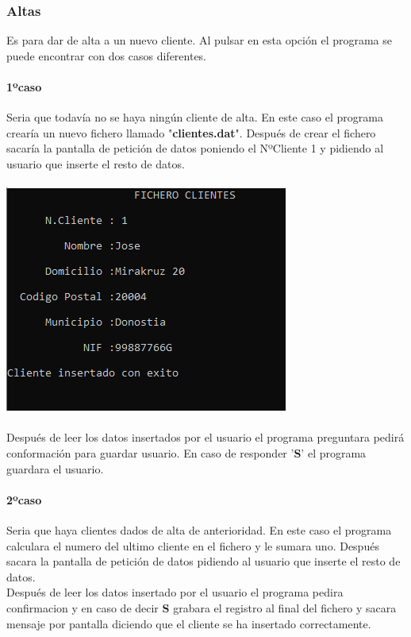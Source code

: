 \documentclass[12pt]{article}
\begin{document}
\subsubsection{Altas}
Es para dar de alta a un nuevo cliente. Al pulsar en esta opción el programa se puede encontrar con dos casos diferentes.

\paragraph{1ºcaso}
Seria que todavía no se haya ningún cliente de alta. En este caso el programa crearía un nuevo fichero llamado "\textbf{clientes.dat}". Después de crear el fichero sacaría la pantalla de petición de datos poniendo el NºCliente 1 y pidiendo al usuario que inserte el resto de datos.\\\\
\includegraphics[]{PrimerClienteInsertado.PNG}\\\\
Después de leer los datos insertados por el usuario el programa preguntara pedirá conformación para guardar usuario. En caso de responder '\textbf{S}' el programa guardara el usuario.

\paragraph{2ºcaso}
Seria que haya clientes dados de alta de anterioridad. En este caso el programa calculara el numero del ultimo cliente en el fichero y le sumara uno. Después sacara la pantalla de petición de datos pidiendo al usuario que inserte el resto de datos.\\
Después de leer los datos insertado por el usuario el programa  pedira confirmacion y en caso de decir \textbf{S} grabara el registro al final del fichero y sacara mensaje por pantalla diciendo que el cliente se ha insertado correctamente.
\end{document}
